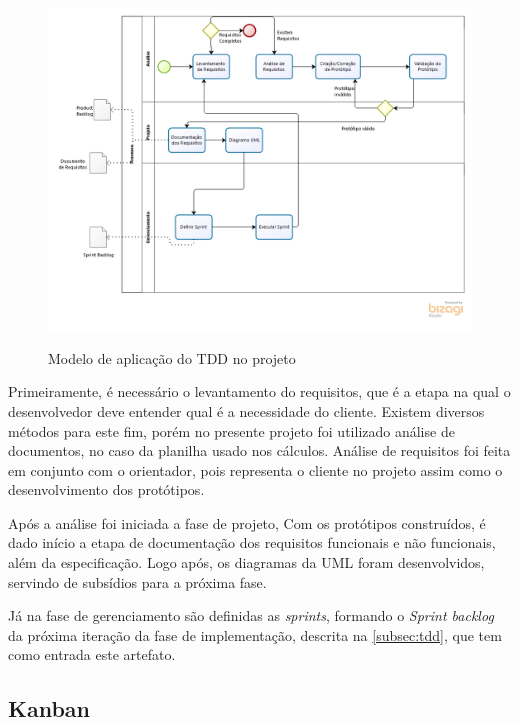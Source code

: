 \begin{figure}[H]
    \centering
    \caption{Modelo de aplicação do TDD no projeto}
    \includegraphics[width=13cm]{dados/figuras/ModeloDoProcesso.png}
    \label{fig:modeloprocesso}
\end{figure}

Primeiramente, é necessário o levantamento do requisitos, que é a etapa na qual o desenvolvedor deve entender qual é a necessidade do cliente. Existem diversos métodos para este fim, porém no presente projeto foi utilizado análise de documentos, no caso da planilha usado nos cálculos. Análise de requisitos foi feita em conjunto com o orientador, pois representa o cliente no projeto assim como o desenvolvimento dos protótipos. 

Após a análise foi iniciada a fase de projeto, Com os protótipos construídos, é dado início a etapa de documentação dos requisitos funcionais e não funcionais, além da especificação. Logo após, os diagramas da UML foram desenvolvidos, servindo de subsídios para a próxima fase.

Já na fase de gerenciamento são definidas as \textit{sprints}, formando o \textit{Sprint backlog} da próxima iteração da fase de implementação, descrita na \autoref{subsec:tdd}, que tem como entrada este artefato.

\subsection{Kanban}
\label{subsec:kanban}

